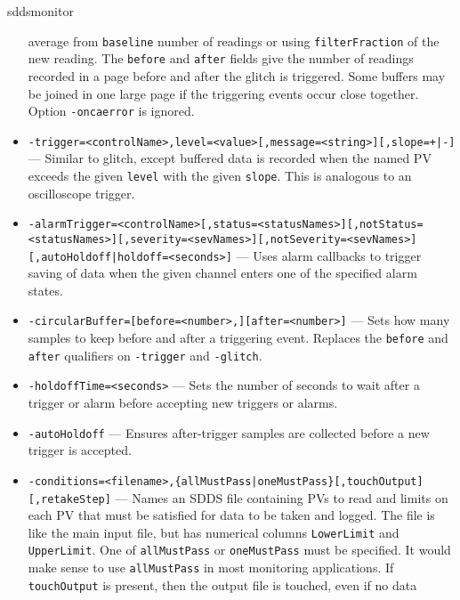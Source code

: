 \begin{sddsprog}{sddsmonitor}
\begin{itemize}
                average from \verb+baseline+ number of readings or using \verb+filterFraction+ of the new reading.
                The \verb+before+ and \verb+after+ fields give the number of readings recorded in a page
                before and after the glitch is triggered. Some buffers may be joined in
                one large page if the triggering events occur close together.
                Option \verb+-oncaerror+ is ignored.
  \item {\tt -trigger=<controlName>,level=<value>[,message=<string>][,slope={+|-}] \newline
[,before=<number>][,after=<number>][,autoArm][,{autoHoldoff|holdoff=<seconds>}]} --- Similar to glitch,
                except buffered data is recorded when the named PV exceeds
                the given \verb+level+ with the given \verb+slope+. This is analogous to an oscilloscope
                trigger.
  \item {\tt -alarmTrigger=<controlName>[,status=<statusNames>][,notStatus=<statusNames>][,severity=<sevNames>][,notSeverity=<sevNames>][,{autoHoldoff|holdoff=<seconds>}]} ---
                Uses alarm callbacks to trigger saving of data when the given channel enters one
                of the specified alarm states.
  \item {\tt -circularBuffer=[before=<number>,][after=<number>]} --- Sets how many samples to keep before and after
                a triggering event. Replaces the \verb+before+ and \verb+after+ qualifiers on \verb+-trigger+ and \verb+-glitch+.
  \item {\tt -holdoffTime=<seconds>} --- Sets the number of seconds to wait after a trigger or alarm
                before accepting new triggers or alarms.
  \item {\tt -autoHoldoff} --- Ensures after-trigger samples are collected before a new trigger is accepted.
  \item {\verb+-conditions=<filename>,{allMustPass|oneMustPass}[,touchOutput][,retakeStep]+} ---
                Names an SDDS file containing PVs to read and limits on each PV that must
                be satisfied for data to be taken and logged. The file is like the main
                input file, but has numerical columns \verb+LowerLimit+ and \verb+UpperLimit+.
                One of \verb+allMustPass+ or \verb+oneMustPass+ must be specified. It would make sense
                to use \verb+allMustPass+ in most monitoring applications.
                If \verb+touchOutput+ is present, then the output file is touched, even if no data

\end{itemize}
\end{sddsprog}
